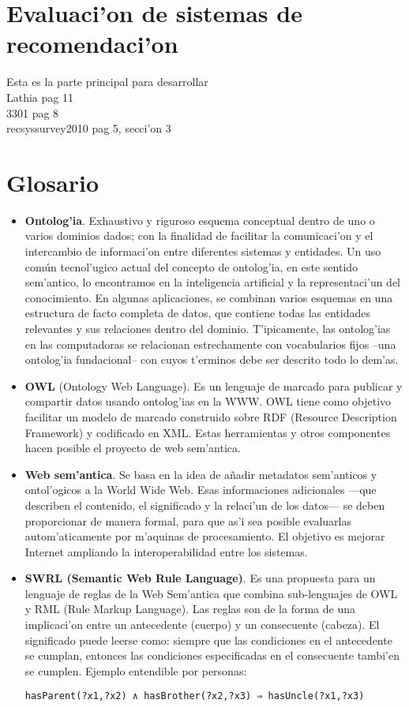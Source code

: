 \documentclass[11pt]{article}
\begin{document}
\section{Evaluaci'on de sistemas de recomendaci'on}
Esta es la parte principal para desarrollar \\
Lathia pag 11\\
3301 pag 8\\
recsyssurvey2010 pag 5, secci'on 3\\
\newpage
\appendix
\section{Glosario}

\begin{itemize}
\item \textbf{Ontolog'ia}. Exhaustivo y riguroso esquema conceptual  dentro de uno o varios dominios dados; con la finalidad de facilitar la comunicaci'on y el intercambio de informaci'on entre diferentes sistemas y entidades. Un uso común tecnol'ugico actual del concepto de ontolog'ia, en este sentido sem'antico, lo encontramos en la inteligencia artificial y la representaci'un del conocimiento. En algunas aplicaciones, se combinan varios esquemas en una estructura de facto completa de datos, que contiene todas las entidades relevantes y sus relaciones dentro del dominio. T'ipicamente, las ontolog'ias en las computadoras se relacionan estrechamente con vocabularios fijos –una ontolog'ia fundacional– con cuyos t'erminos debe ser descrito todo lo dem'as.
\item \textbf{OWL} (Ontology Web Language). Es un lenguaje de marcado para publicar y compartir datos usando ontolog'ias en la WWW. OWL tiene como objetivo facilitar un modelo de marcado construido sobre RDF (Resource Description Framework) y codificado en XML. Estas herramientas y otros componentes hacen posible el proyecto de web sem'antica.
\item \textbf{Web sem'antica}. Se basa en la idea de añadir metadatos sem'anticos y ontol'ogicos a la World Wide Web.  Esas informaciones adicionales —que describen el contenido, el significado y la relaci'un de los datos— se deben proporcionar de manera formal, para que as'i sea posible evaluarlas autom'aticamente por m'aquinas de procesamiento. El objetivo es mejorar Internet ampliando la interoperabilidad entre los sistemas.
\item \textbf{SWRL (Semantic Web Rule Language)}. Es una propuesta para un lenguaje de reglas de la Web Sem'antica que combina sub-lenguajes de OWL y RML (Rule Markup Language). Las reglas son de la forma de una implicaci'on entre un antecedente (cuerpo) y un consecuente (cabeza). El significado puede leerse como: siempre que las condiciones en el antecedente se cumplan, entonces las condiciones especificadas en el consecuente tambi'en se cumplen. Ejemplo entendible por personas:
\begin{verbatim}
hasParent(?x1,?x2) ∧ hasBrother(?x2,?x3) ⇒ hasUncle(?x1,?x3)
\end{verbatim}


\end{itemize}
\end{document}

